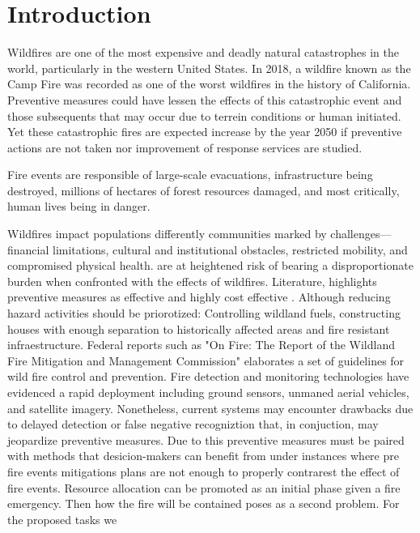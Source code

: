 \documentclass{scspaperproc}
\theoremstyle{scsthe}
\begin{document}
\section{Introduction}
\label{Introduction}

{W}{ildfires} are one of the most expensive and deadly natural catastrophes in the world, particularly in the western United States. 
In 2018, a wildfire known as the Camp Fire was recorded as one of the worst wildfires in the history of California. Preventive measures could have lessen the effects of this catastrophic event  and those subsequents that may occur due to terrein conditions or human initiated.
Yet these catastrophic fires are expected increase by the year 2050 \cite{nations_as_nodate} if preventive actions are not taken nor improvement of response services are studied. 

Fire events are responsible of large-scale evacuations, infrastructure being destroyed, millions of hectares of forest resources damaged, and most critically, human lives being in danger.



Wildfires impact populations differently communities marked by challenges—financial limitations, cultural and institutional obstacles, restricted mobility, and compromised physical health. 
are at heightened risk of bearing a disproportionate burden when confronted with the effects of wildfires. 
Literature, highlights preventive measures as effective and highly cost effective \cite{baylis_economic_2023}. Although reducing hazard activities should be priorotized: Controlling wildland fuels, constructing houses with enough separation to historically affected areas and fire resistant infraestructure. 
Federal reports such as "On Fire: The Report of the Wildland Fire Mitigation and Management Commission" elaborates a set of guidelines for wild fire control and prevention.
Fire detection and monitoring technologies have evidenced a rapid deployment including ground sensors, unmaned aerial vehicles, and satellite imagery.
Nonetheless, current systems may encounter drawbacks due to delayed detection or false negative recogniztion that, in conjuction, may jeopardize 
preventive measures.
Due to this preventive measures must be paired with methods that desicion-makers
can benefit from under instances where pre fire events mitigations plans are not enough to properly contrarest the effect of fire events.
Resource allocation can be promoted as an initial phase given a fire emergency. Then how the fire will be contained poses as a second problem.
For the proposed tasks we 
\end{document}
